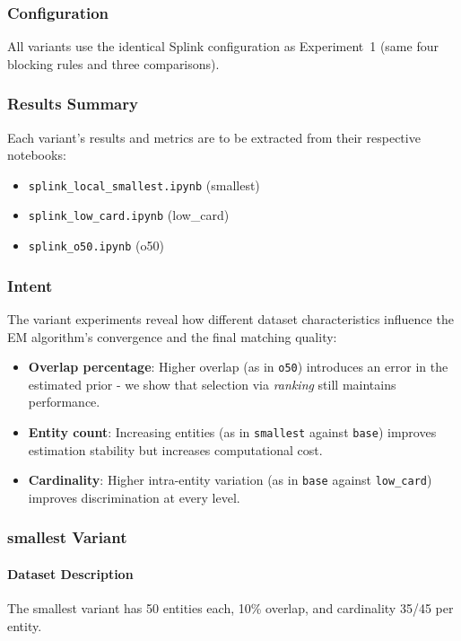 \subsubsection{Configuration}
All variants use the identical Splink configuration as Experiment~1 (same four blocking rules and three comparisons).
\subsubsection{Results Summary}
Each variant's results and metrics are to be extracted from their respective notebooks:
\begin{itemize}
    \item \texttt{splink\_local\_smallest.ipynb} (smallest)
    \item \texttt{splink\_low\_card.ipynb} (low\_card)
    \item \texttt{splink\_o50.ipynb} (o50)
\end{itemize}

\subsubsection{Intent}
The variant experiments reveal how different dataset characteristics influence the EM algorithm's convergence and the final matching quality:
\begin{itemize}
    \item \textbf{Overlap percentage}: Higher overlap (as in \texttt{o50}) introduces an error in the estimated prior - we show that selection via \textit{ranking} still maintains performance.
    \item \textbf{Entity count}: Increasing entities (as in \texttt{smallest} against \texttt{base}) improves estimation stability but increases computational cost.
    \item \textbf{Cardinality}: Higher intra-entity variation (as in \texttt{base} against \texttt{low\_card}) improves discrimination at every level.
\end{itemize}

\subsubsection{smallest Variant}
\label{sec:exp_smallest}
\paragraph{Dataset Description}
The smallest variant has 50 entities each, 10\% overlap, and cardinality 35/45 per entity.

